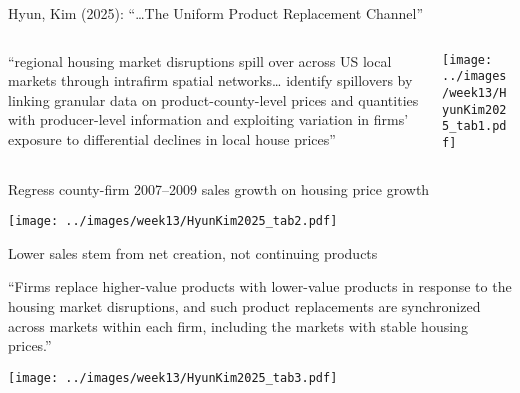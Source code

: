 \documentclass[11pt,notes=hide,aspectratio=169]{beamer}
\begin{document}
\begin{frame}{Hyun, Kim (2025): ``\dots The Uniform Product Replacement Channel''}
\begin{columns}
\begin{column}{0.30\textwidth}{\footnotesize
``regional housing market disruptions spill over across US local markets through intrafirm spatial networks\dots
identify spillovers by linking granular data on product-county-level prices and quantities with producer-level information and exploiting variation in firms’ exposure to differential declines in local house prices''
\par}\end{column}
\begin{column}{0.68\textwidth}
\texttt{[image: ../images/week13/HyunKim2025\_tab1.pdf]}
\end{column}
\end{columns}
\end{frame}
\begin{frame}{Regress county-firm 2007--2009 sales growth on housing price growth}
\begin{center}
\texttt{[image: ../images/week13/HyunKim2025\_tab2.pdf]}
\end{center}
\end{frame}
\begin{frame}{Lower sales stem from net creation, not continuing products}
{\scriptsize ``Firms replace higher-value products with lower-value products in response to the housing market disruptions, and such product replacements are synchronized across markets within each firm, including the markets with stable housing prices.''\par}
\begin{center}
\vspace{-2mm}
\texttt{[image: ../images/week13/HyunKim2025\_tab3.pdf]}
\end{center}
\end{frame}
\end{document}
